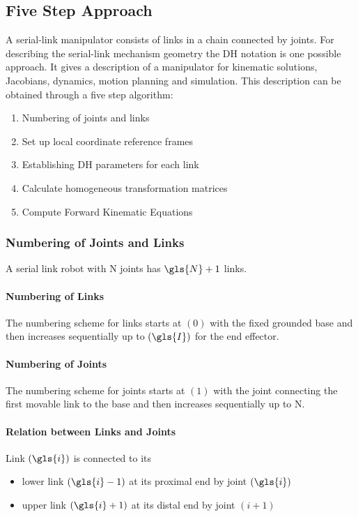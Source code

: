 \subsection{Five Step Approach}
A serial-link manipulator consists of links in a chain connected by joints. 
For describing the serial-link mechanism geometry the \acrfull{DH} notation is one possible approach.
It gives a description of a manipulator for kinematic solutions, Jacobians, dynamics, motion planning and simulation. 
This description can be obtained through a five step algorithm:\cite{ConstantinForwardKA}

\begin{enumerate}
	\item Numbering of joints and links
	\item Set up local coordinate reference frames
	\item Establishing \ac{DH} parameters for each link
	\item Calculate homogeneous transformation matrices
	\item Compute Forward Kinematic Equations
\end{enumerate}

\subsubsection{Numbering of Joints and Links} \label{sec:NumJointLink}
A serial link robot with \gls{N} joints has $\gls{N}+1$ links. 

\paragraph{Numbering of Links}
The numbering scheme for links starts at $(0)$ with the fixed grounded base and then increases sequentially up to $(\gls{I})$ for the end effector.

\paragraph{Numbering of Joints}
The numbering scheme for joints starts at $(1)$ with the joint connecting the first movable link to the base and then increases sequentially up to \gls{N}.

\paragraph{Relation between Links and Joints}
Link $(\gls{i})$ is connected to its 
\begin{itemize}
	\item lower link $(\gls{i}-1)$ at its proximal \cite{proxdist} end by joint $(\gls{i})$
	\item upper link $(\gls{i}+1)$ at its distal \cite{proxdist} end by joint $(i+1)$
\end{itemize}



